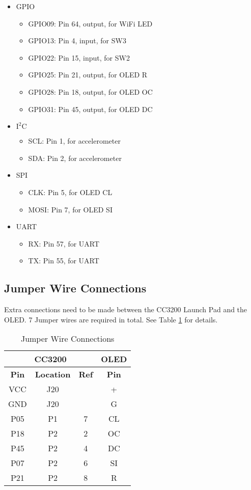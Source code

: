 \documentclass[conference]{IEEEtran}
\begin{document}
\begin{itemize}
\item GPIO
	\begin{itemize}
	\item GPIO09: Pin 64, output, for WiFi LED
	\item GPIO13: Pin 4, input, for SW3
	\item GPIO22: Pin 15, input, for SW2
	\item GPIO25: Pin 21, output, for OLED R
	\item GPIO28: Pin 18, output, for OLED OC
	\item GPIO31: Pin 45, output, for OLED DC
	\end{itemize}
\item $\text{I}^\text{2}\text{C}$
	\begin{itemize}
	\item SCL: Pin 1, for accelerometer
	\item SDA: Pin 2, for accelerometer
	\end{itemize}
\item SPI
	\begin{itemize}
	\item CLK: Pin 5, for OLED CL
	\item MOSI: Pin 7, for OLED SI
	\end{itemize}
\item UART
	\begin{itemize}
	\item RX: Pin 57, for UART
	\item TX: Pin 55, for UART
	\end{itemize}
\end{itemize}

\subsection{Jumper Wire Connections}
Extra connections need to be made between the CC3200 Launch Pad and the OLED.
 7 Jumper wires are required in total. See Table \ref{tab:jwc} for details.

\begin{table}[htbp]
\caption{Jumper Wire Connections}
\begin{center}
\begin{tabular}{ | c | c | c | c | }\hline
\multicolumn{3}{|c|}{\textbf{CC3200}} & \textbf{OLED} \\ \hline
\textbf{Pin} & \textbf{Location} & \textbf{Ref} & \textbf{Pin} \\ \hline
VCC & J20 &  & + \\ \hline
GND & J20 &  & G \\ \hline
P05 & P1 & 7 & CL \\ \hline
P18 & P2 & 2 & OC \\ \hline
P45 & P2 & 4 & DC \\ \hline
P07 & P2 & 6 & SI \\ \hline
P21 & P2 & 8 & R \\ \hline
\end{tabular}
\label{tab:jwc}
\end{center}
\end{table}
\end{document}
